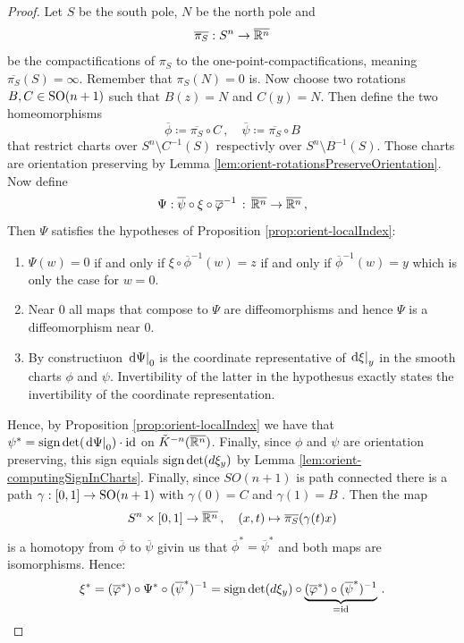 \begin{proof}
    Let $S$ be the south pole, $N$ be the north pole and 
    \begin{equation*}
        \overline{\pi_S}:S^n \to \overline{\mathbb{R}^n}
    \end{equation*} be the compactifications of $\pi_S$  to the one-point-compactifications, meaning $\overline{\pi_S}(S)=\infty$. Remember that $\pi_S(N)=0$ is. Now choose two rotations $B,C\in \mathrm{SO}(n+1)$ such that $B(z)=N$ and $C(y)=N$. Then define the two homeomorphisms
    \begin{equation*}
        \overline{\phi}\coloneq \overline{\pi_S}\circ C\,,\quad \overline{ \psi}\coloneq \overline{\pi_S}\circ B
    \end{equation*} that restrict charts over $S^n\setminus C^{-1}(S)$ respectivly over $S^n\setminus B^{-1}(S)$. Those charts are orientation preserving by Lemma \ref{lem:orient-rotationsPreserveOrientation}.
    Now define
    \begin{equation*}
        \Psi:\overline{\psi}\circ \xi \circ \overline{\varphi}^{-1}\,:\, \overline{\mathbb{R}^n}\to \overline{\mathbb{R}^n}\,,
    \end{equation*}
    Then $\Psi$ satisfies the hypotheses of Proposition \ref{prop:orient-localIndex}:
\begin{enumerate}
    \item $\Psi(w)=0$ if and only if $\xi\circ \overline{\phi}^{-1}(w)=z$ if and only if $\overline{\phi}^{-1}(w)=y$ which is only the case for $w=0$.
    \item Near $0$ all maps that compose to $\Psi$ are diffeomorphisms and hence $\Psi$ is a diffeomorphism near $0$.
    \item By constructiuon $\left.\mathop{}\!\mathrm{d} \Psi\right|_{0}$ is the coordinate representative of $\left.\mathop{}\!\mathrm{d} \xi\right|_{y}$ in the smooth charts $\phi$ and $\psi$. Invertibility of the latter in the hypothesus exactly states the invertibility of the coordinate representation.
\end{enumerate}
Hence, by Proposition \ref{prop:orient-localIndex} we have that $\psi^*=\mathrm{sign} \det (\left.\mathop{}\!\mathrm{d} \Psi\right|_{0})\cdot \operatorname{\mathrm{id}}$ on $\tilde{K}^{-n}(\overline{\mathbb{R}^n})$. Finally, since $\phi$ and $\psi$ are orientation preserving, this sign equials $\mathrm{sign} \det(d\xi_y)$ by Lemma \ref{lem:orient-computingSignInCharts}. Finally, since $SO(n+1)$ is path connected there is a path 
$\gamma:[0,1]\to \mathrm{SO}(n+1)$ with $\gamma(0)=C$ and $\gamma(1)=B$ . Then the map 
    \begin{equation*}
        S^n\times [0,1] \to \overline{\mathbb{R}^n}\,,\quad (x,t)\mapsto \overline{\pi_S}(\gamma(t)x)
    \end{equation*} is a homotopy from $\overline{\phi}$ to $\overline{\psi}$ givin us that $\overline{\phi}^*=\overline{\psi}^*$ and both maps are isomorphisms. Hence:
    \begin{equation*}
        \xi^*=(\overline{\varphi}^*)\circ \Psi^*\circ (\overline{\psi}^*)^{-1}=\mathrm{sign} \det(d\xi_y)\circ \underbrace{(\overline{\varphi}^*)\circ (\overline{\psi}^*)^{-1}}_{=\operatorname{\mathrm{id}}}\,.
    \end{equation*}
\end{proof}